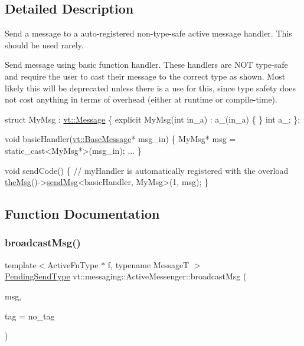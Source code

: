 \subsection{Detailed Description}
Send a message to a auto-\/registered non-\/type-\/safe active message handler. This should be used rarely. 

Send message using basic function handler. These handlers are N\+OT type-\/safe and require the user to cast their message to the correct type as shown. Most likely this will be deprecated unless there is a use for this, since type safety does not cost anything in terms of overhead (either at runtime or compile-\/time).


\begin{DoxyCode}
\textcolor{keyword}{struct }MyMsg : \hyperlink{structvt_1_1messaging_1_1_active_msg}{vt::Message} \{
  \textcolor{keyword}{explicit} MyMsg(\textcolor{keywordtype}{int} in\_a) : a\_(in\_a) \{ \}
  \textcolor{keywordtype}{int} a\_;
\};

\textcolor{keywordtype}{void} basicHandler(\hyperlink{structvt_1_1messaging_1_1_base_msg}{vt::BaseMessage}* msg\_in) \{
  MyMsg* msg = \textcolor{keyword}{static\_cast<}MyMsg*\textcolor{keyword}{>}(msg\_in);
  ...
\}

\textcolor{keywordtype}{void} sendCode() \{
  \textcolor{comment}{// myHandler is automatically registered with the overload}
  \hyperlink{namespacevt_aeafd31f866aeb4dc6fc2f6ee97136350}{theMsg}()->\hyperlink{group__preregister_ga55c6ea91181ae20c681e73a356750916}{sendMsg}<basicHandler, MyMsg>(1, msg);
\}
\end{DoxyCode}
 

\subsection{Function Documentation}
\mbox{\label{group__basicsend_gaa5b764aaa06e9c9141b04f6d8a420d43}} 
\subsubsection{\texorpdfstring{broadcast\+Msg()}{broadcastMsg()}}
{\footnotesize\ttfamily template$<$Active\+Fn\+Type $\ast$ f, typename MessageT $>$ \\
\hyperlink{structvt_1_1messaging_1_1_active_messenger_a3626a6ca76d8ad4ec7c3b47a2c70d3a8}{Pending\+Send\+Type} vt\+::messaging\+::\+Active\+Messenger\+::broadcast\+Msg (\begin{DoxyParamCaption}\item[{MessageT $\ast$const}]{msg,  }\item[{\hyperlink{namespacevt_a84ab281dae04a52a4b243d6bf62d0e52}{Tag\+Type} const \&}]{tag = {\ttfamily no\+\_\+tag} }\end{DoxyParamCaption})}



